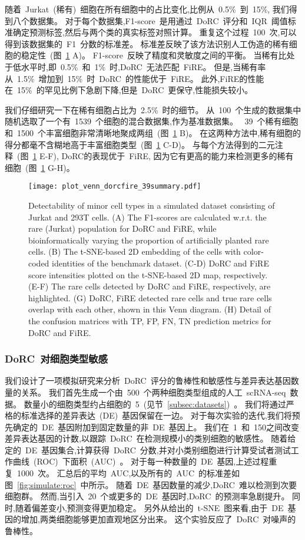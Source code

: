 随着~Jurkat~(稀有)~细胞在所有细胞中的占比变化,比例从~0.5\%~到~15\%,
我们得到八个数据集。
对于每个数据集,F1-score~是用通过~DoRC~评分和~IQR~阈值标准确定预测标签,然后与两个类的真实标签对照计算。
重复这个过程~100~次,可以得到该数据集的~F1~分数的标准差。
标准差反映了该方法识别人工伪造的稀有细胞的稳定性~(图~\ref{fig:jurkat} A)。 
F1-score~反映了精度和灵敏度之间的平衡。
当稀有比处于低水平时,即~0.5\%~和~1\%~时,DoRC~无法匹配~FiRE。
但是,当稀有率从~1.5\%~增加到~15\%~时~DoRC~的性能优于~FiRE。
此外,FiRE的性能在~15\%~的罕见比例下急剧下降,但是~DoRC~更保守,性能损失较小。

我们仔细研究一下在稀有细胞占比为~2.5\%~时的细节。
从~100~个生成的数据集中随机选取了一个有~1539~个细胞的混合数据集,作为基准数据集。
~39~个稀有细胞和~1500~个丰富细胞非常清晰地聚成两组~(图~\ref{fig:jurkat} B)。
在这两种方法中,稀有细胞的得分都毫不含糊地高于丰富细胞类型~(图~\ref{fig:jurkat} C-D)。
与每个方法得到的二元注释~(图~\ref{fig:jurkat} E-F),
DoRC的表现优于~FiRE,
因为它有更高的能力来检测更多的稀有细胞~(图~\ref{fig:jurkat} G-H)。

\begin{figure}[!htbp]
    \centering
    \texttt{[image: plot\_venn\_dorcfire\_39summary.pdf]}
    \caption{Detectability of minor cell types in a simulated dataset consisting of Jurkat and 293T cells. 
    (A) The F1-scores are calculated w.r.t. the rare (Jurkat) population for DoRC and FiRE, 
    while bioinformatically varying the proportion of artificially planted rare cells.
    (B) The t-SNE-based 2D embedding of the cells with color-coded identities of the benchmark dataset.
    (C-D) DoRC and FiRE score intensities plotted on the t-SNE-based 2D map, respectively. 
    (E-F) The rare cells detected by DoRC and FiRE, respectively, are highlighted.
    (G) DoRC, FiRE detected rare cells and true rare cells overlap with each other, shown in this Venn diagram. 
    (H) Detail of the confusion matrices with TP, FP, FN, TN prediction metrics for DoRC and FiRE.}
    \label{fig:jurkat}
\end{figure}

\subsubsection{DoRC~对细胞类型敏感}
我们设计了一项模拟研究来分析~DoRC~评分的鲁棒性和敏感性与差异表达基因数量的关系。
我们首先生成一个由~500~个两种细胞类型组成的人工~scRNA-seq~数据。
数量小的细胞类型约占细胞的~5\％~(见节~\ref{subsec:datasets})~。
我们将通过严格的标准选择的差异表达~(DE)~基因保留在一边。
对于每次实验的迭代,我们将预先确定的~DE~基因附加到固定数量的非~DE~基因上。
我们在~1~和~150之间改变差异表达基因的计数,以跟踪~DoRC~在检测规模小的类别细胞的敏感性。
随着给定的~DE~基因集合,计算获得~DoRC~分数,并对小类别细胞进行计算受试者测试工作曲线~(ROC)~下面积~(AUC)~。
对于每一种数量的~DE~基因,上述过程重复~1000~次。
汇总后的平均~AUC,以及所有的~AUC~的标准差如图~\ref{fig:simulate:roc}~中所示。
随着~DE~基因数量的减少,DoRC~难以检测到次要细胞群。
然而,当引入~20~个或更多的~DE~基因时,DoRC~的预测率急剧提升。
同时,随着偏差变小,预测变得更加稳定。
另外从给出的~t-SNE~图来看,由于~DE~基因的增加,两类细胞能够更加直观地区分出来。
这个实验反应了~DoRC~对噪声的鲁棒性。

